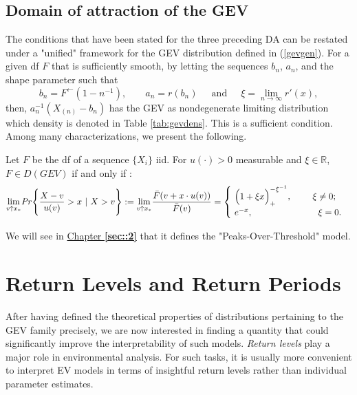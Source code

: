 \subsection{Domain of attraction of the GEV}
The conditions that have been stated for the three preceding DA can be restated under a "unified" framework for the GEV distribution defined in (\ref{gevgen}).
For a given df $F$ that is sufficiently smooth, by letting the sequences $b_n$, $a_n$, and the shape parameter such that
\begin{equation*}
b_n=F^{\leftarrow}(1-n^{-1})\text{, } \ \ \ \ \ \ \ \ a_n=r(b_n) \ \ \ \ \ \text{ and } \ \ \ \ \ \xi=\displaystyle{\lim_{n \to \infty}}r'(x),
\end{equation*}
 then, $a_n^{-1}(X_{(n)}-b_n)$ has the GEV as nondegenerate limiting distribution which density is denoted in Table \ref{tab:gevdens}. This is a sufficient condition.
 Among many characterizations, we present the following. 
\begin{theorem}
	Let $F$ be the df of a sequence $\{X_i\}$ iid. For $u(\cdot)>0$ measurable and $\xi\in\mathbb{R}$,\\ $F\in D(GEV)$ if and only if :
	\begin{equation}
	\displaystyle{\lim_{v \uparrow x_*}} \text{\emph{Pr}} \Bigg\{\frac{X-v}{u(v)}>x \ | \ X>v\Bigg\}:=\displaystyle{\lim_{v \uparrow x_*}}\frac{\bar{F}(v+x\cdot u(v))}{\bar{F}(v)}=\begin{cases}
	\ \Big(1+\xi x\Big)_+^{-\xi^{-1}}, \ \ \ \ \ \ \ \xi\neq 0;    \\
	\  e^{-x}, \ \ \ \ \ \ \ \ \ \ \ \ \ \ \ \ \qquad \xi=0.
	\end{cases}
	\end{equation}
\end{theorem}
We will see in \hyperref[sec::2]{Chapter \textbf{\ref{sec::2}}} that it defines the "Peaks-Over-Threshold" model.

\section{Return Levels and Return Periods}\label{rlgev}


After having defined the theoretical properties of distributions pertaining to the GEV family precisely, we are now interested in finding a quantity that could significantly improve the interpretability of such models.
\emph{Return levels} play a major role in environmental analysis. For such tasks, it is usually more convenient to interpret EV models in terms of insightful return levels rather than individual parameter estimates. 

